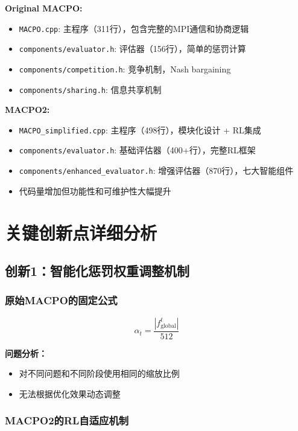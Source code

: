 \documentclass[15pt,a3paper]{ctexart}
\begin{document}
\textbf{Original MACPO:}
\begin{itemize}
    \item \texttt{MACPO.cpp}: 主程序（311行），包含完整的MPI通信和协商逻辑
    \item \texttt{components/evaluator.h}: 评估器（156行），简单的惩罚计算
    \item \texttt{components/competition.h}: 竞争机制，Nash bargaining
    \item \texttt{components/sharing.h}: 信息共享机制
\end{itemize}

\textbf{MACPO2:}
\begin{itemize}
    \item \texttt{MACPO\_simplified.cpp}: 主程序（498行），模块化设计 + RL集成
    \item \texttt{components/evaluator.h}: 基础评估器（400+行），完整RL框架
    \item \texttt{components/enhanced\_evaluator.h}: 增强评估器（870行），七大智能组件
    \item 代码量增加但功能性和可维护性大幅提升
\end{itemize}

\section{关键创新点详细分析}

\subsection{创新1：智能化惩罚权重调整机制}

\subsubsection{原始MACPO的固定公式}

\begin{equation}
\alpha_t = \frac{|f^t_{\text{global}}|}{512}
\end{equation}

\textbf{问题分析：}
\begin{itemize}
    \item 对不同问题和不同阶段使用相同的缩放比例
    \item 无法根据优化效果动态调整
\end{itemize}

\subsubsection{MACPO2的RL自适应机制}
\end{document}
